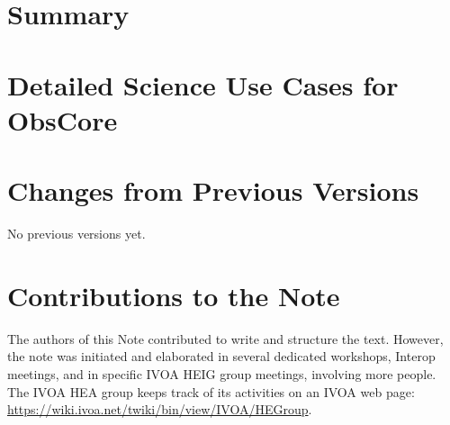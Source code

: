 \documentclass[11pt,a4paper]{ivoa}
\begin{document}
\section{Summary}\label{sec:summary}


\pagebreak
\printglossaries



\appendix


\section{Detailed Science Use Cases for ObsCore}
\label{sec:uc}




\section{Changes from Previous Versions}

No previous versions yet.


\section{Contributions to the Note}

The authors of this Note contributed to write and structure the text. However, the note was initiated and elaborated in several dedicated workshops, Interop meetings,  and in specific \gls{IVOA} \gls{HEIG} group meetings, involving more people. The \gls{IVOA} \gls{HEA} group keeps track of its activities on an \gls{IVOA} web page: \url{https://wiki.ivoa.net/twiki/bin/view/IVOA/HEGroup}.
\end{document}
